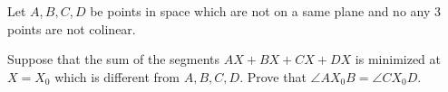 Let $A,B,C,D$ be points in space which are not on a same plane and no any 3 points are not colinear.

Suppose that the sum of the segments $AX+BX+CX+DX$ is minimized at $X=X_0$ which is different from $A,B,C,D.$ Prove that $\angle{AX_0B}=\angle{CX_0D}.$